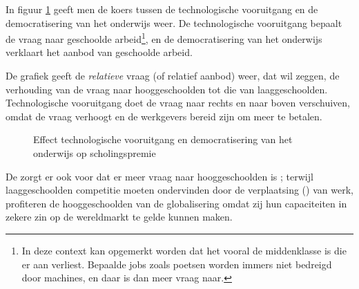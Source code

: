 \par In figuur \ref{fig:h6schoolarbeid} geeft men de koers tussen de technologische vooruitgang en de democratisering van het onderwijs weer. De technologische vooruitgang bepaalt de vraag naar geschoolde arbeid\footnote{In deze context kan opgemerkt worden dat het vooral de middenklasse is die er aan verliest. Bepaalde jobs zoals poetsen worden immers niet bedreigd door machines, en daar is dan meer vraag naar.}, en de democratisering van het onderwijs verklaart het aanbod van geschoolde arbeid.
\par De grafiek geeft de \textit{relatieve} vraag (of relatief aanbod) weer, dat wil zeggen, de verhouding van de vraag naar hooggeschoolden tot die van laaggeschoolden. Technologische vooruitgang doet de vraag naar rechts en naar boven verschuiven, omdat de vraag verhoogt en de werkgevers bereid zijn om meer te betalen.

\begin{figure}[H]
\vspace{0.5cm}
\centering\small
\captionsetup{justification=centering,margin=2cm}
\caption{Effect technologische vooruitgang en democratisering van het onderwijs op scholingspremie}
\label{fig:h6schoolarbeid}
\end{figure}

\noindent De  zorgt er ook voor dat er meer vraag naar hooggeschoolden is ; terwijl laaggeschoolden competitie moeten ondervinden door de verplaatsing () van werk, profiteren de hooggeschoolden van de globalisering omdat zij hun capaciteiten in zekere zin op de wereldmarkt te gelde kunnen maken.\\

